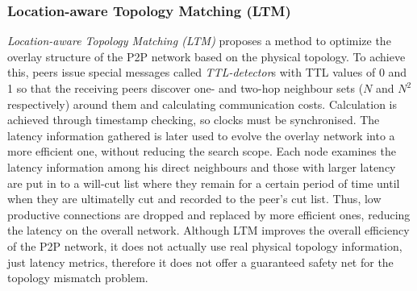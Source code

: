 \subsubsection{Location-aware Topology Matching (LTM)}
\emph{Location-aware Topology Matching (LTM)} \cite{liu_ltm_2004} proposes a
method to optimize the overlay structure of the P2P network based on the
physical topology. To achieve this, peers issue special messages called
\textit{TTL-detector}s with TTL values of 0 and 1 so that the receiving peers
discover one- and two-hop neighbour sets ($N$ and $N^2$ respectively) around
them and calculating communication costs. Calculation is achieved through
timestamp checking, so clocks must be synchronised. The latency information
gathered is later used to evolve the overlay network into a more efficient one,
without reducing the search scope. Each node examines the latency information
among his direct neighbours and those with larger latency are put in to a
will-cut list where they remain for a certain period of time until when they are
ultimatelly cut and recorded to the peer's cut list. Thus, low productive
connections are dropped and replaced by more efficient ones, reducing the
latency on the overall network. Although LTM improves the overall efficiency of
the P2P network, it does not actually use real physical topology information,
just latency metrics, therefore it does not offer a guaranteed safety net for
the topology mismatch problem.

